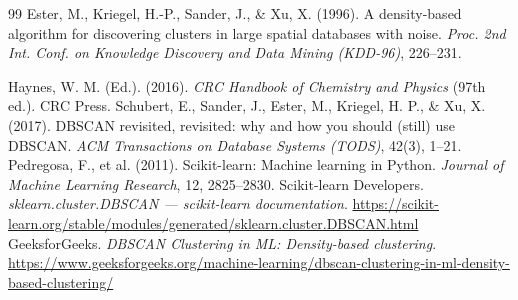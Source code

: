 \documentclass[a4paper,11pt]{article}
\begin{document}
\begin{thebibliography}{99}
 Ester, M., Kriegel, H.-P., Sander, J., \& Xu, X. (1996). A density-based algorithm for discovering clusters in large spatial databases with noise. \textit{Proc. 2nd Int. Conf. on Knowledge Discovery and Data Mining (KDD-96)}, 226--231.

 Haynes, W. M. (Ed.). (2016). \textit{CRC Handbook of Chemistry and Physics} (97th ed.). CRC Press.
 Schubert, E., Sander, J., Ester, M., Kriegel, H. P., \& Xu, X. (2017). DBSCAN revisited, revisited: why and how you should (still) use DBSCAN. \textit{ACM Transactions on Database Systems (TODS)}, 42(3), 1--21.
 Pedregosa, F., et al. (2011). Scikit-learn: Machine learning in Python. \textit{Journal of Machine Learning Research}, 12, 2825--2830.
 Scikit-learn Developers. \textit{sklearn.cluster.DBSCAN --- scikit-learn documentation}. \url{https://scikit-learn.org/stable/modules/generated/sklearn.cluster.DBSCAN.html}
 GeeksforGeeks. \textit{DBSCAN Clustering in ML: Density-based clustering}. \url{https://www.geeksforgeeks.org/machine-learning/dbscan-clustering-in-ml-density-based-clustering/}
\end{thebibliography}
\end{document}
